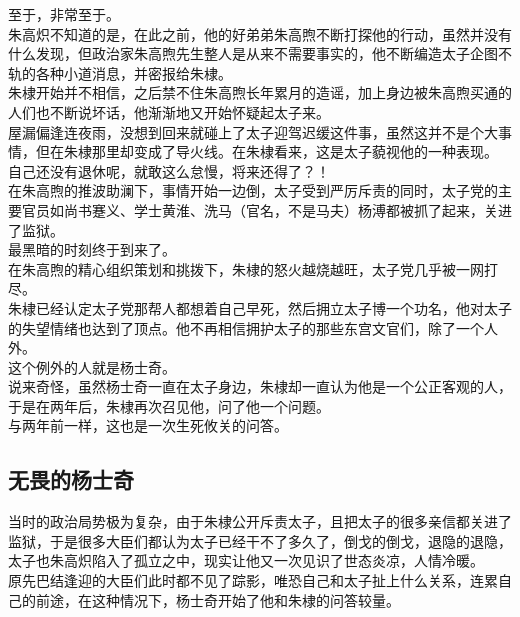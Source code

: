 \begin{multicols}{\theparacolNo}
至于，非常至于。\\

朱高炽不知道的是，在此之前，他的好弟弟朱高煦不断打探他的行动，虽然并没有什么发现，但政治家朱高煦先生整人是从来不需要事实的，他不断编造太子企图不轨的各种小道消息，并密报给朱棣。\\

朱棣开始并不相信，之后禁不住朱高煦长年累月的造谣，加上身边被朱高煦买通的人们也不断说坏话，他渐渐地又开始怀疑起太子来。\\

屋漏偏逢连夜雨，没想到回来就碰上了太子迎驾迟缓这件事，虽然这并不是个大事情，但在朱棣那里却变成了导火线。在朱棣看来，这是太子藐视他的一种表现。\\

自己还没有退休呢，就敢这么怠慢，将来还得了？！\\

在朱高煦的推波助澜下，事情开始一边倒，太子受到严厉斥责的同时，太子党的主要官员如尚书蹇义、学士黄淮、洗马（官名，不是马夫）杨溥都被抓了起来，关进了监狱。\\

最黑暗的时刻终于到来了。\\

在朱高煦的精心组织策划和挑拨下，朱棣的怒火越烧越旺，太子党几乎被一网打尽。\\

朱棣已经认定太子党那帮人都想着自己早死，然后拥立太子博一个功名，他对太子的失望情绪也达到了顶点。他不再相信拥护太子的那些东宫文官们，除了一个人外。\\

这个例外的人就是杨士奇。\\

说来奇怪，虽然杨士奇一直在太子身边，朱棣却一直认为他是一个公正客观的人，于是在两年后，朱棣再次召见他，问了他一个问题。\\

与两年前一样，这也是一次生死攸关的问答。\\

\subsection{无畏的杨士奇}
当时的政治局势极为复杂，由于朱棣公开斥责太子，且把太子的很多亲信都关进了监狱，于是很多大臣们都认为太子已经干不了多久了，倒戈的倒戈，退隐的退隐，太子也朱高炽陷入了孤立之中，现实让他又一次见识了世态炎凉，人情冷暖。\\

原先巴结逢迎的大臣们此时都不见了踪影，唯恐自己和太子扯上什么关系，连累自己的前途，在这种情况下，杨士奇开始了他和朱棣的问答较量。\\


\end{multicols}
